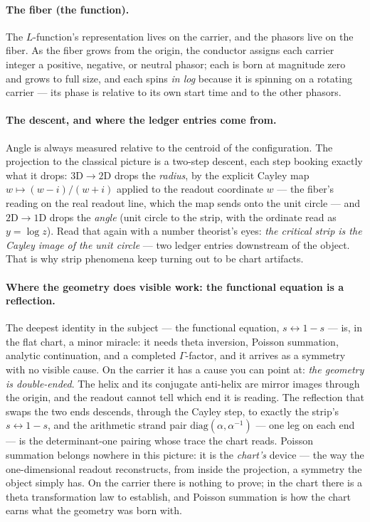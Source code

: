 \documentclass[11pt]{article}
\begin{document}
\paragraph{The fiber (the function).}  The $L$-function's representation lives
on the carrier, and the phasors live on the fiber.  As the fiber grows from the
origin, the conductor assigns each carrier integer a positive, negative, or
neutral phasor; each is born at magnitude zero and grows to full size, and each
spins \emph{in log} because it is spinning on a rotating carrier --- its phase
is relative to its own start time and to the other phasors.

\paragraph{The descent, and where the ledger entries come from.}  Angle is
always measured relative to the centroid of the configuration.  The projection
to the classical picture is a two-step descent, each step booking exactly what
it drops: $3\mathrm D\to2\mathrm D$ drops the \emph{radius}, by the explicit
Cayley map $w\mapsto(w-i)/(w+i)$ applied to the readout coordinate $w$ --- the
fiber's reading on the real readout line, which the map sends onto the unit
circle --- and
$2\mathrm D\to1\mathrm D$ drops the \emph{angle} (unit circle to the strip,
with the ordinate read as $y=\log z$).  Read that again
with a number theorist's eyes: \emph{the critical strip is the Cayley image of
the unit circle} --- two ledger entries downstream of the object.  That is why
strip phenomena keep turning out to be chart artifacts.

\paragraph{Where the geometry does visible work: the functional equation is a
reflection.}  The deepest identity in the subject --- the functional equation,
$s\leftrightarrow1-s$ --- is, in the flat chart, a minor miracle: it needs theta
inversion, Poisson summation, analytic continuation, and a completed
$\Gamma$-factor, and it arrives as a symmetry with no visible cause.  On the
carrier it has a cause you can point at: \emph{the geometry is double-ended}.
The helix and its conjugate anti-helix are mirror images through the origin,
and the readout cannot tell which end it is reading.  The reflection that swaps
the two ends descends, through the Cayley step, to exactly the strip's
$s\leftrightarrow1-s$, and the arithmetic strand pair
$\mathrm{diag}(\alpha,\alpha^{-1})$ --- one leg on each end --- is the
determinant-one pairing whose trace the chart reads.  Poisson summation belongs
nowhere in this picture: it is the \emph{chart's} device --- the way the
one-dimensional readout reconstructs, from inside the projection, a symmetry
the object simply has.  On the carrier there is nothing to prove; in the chart
there is a theta transformation law to establish, and Poisson summation is how
the chart earns what the geometry was born with.
\end{document}
